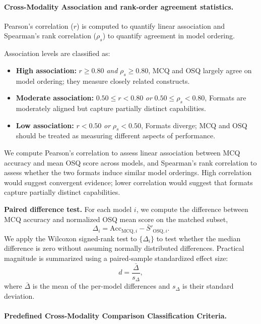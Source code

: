 \paragraph{Cross-Modality Association and rank-order agreement statistics.}
    Pearson's correlation ($r$) is computed to quantify linear association and Spearman's rank correlation ($\rho_s$) to quantify agreement in model ordering.

    Association levels are classified as:
    \begin{itemize}[nosep]
        \item \textbf{High association:} $r \ge 0.80$ \emph{and} $\rho_s \ge 0.80$, MCQ and OSQ largely agree on model ordering; they measure closely related constructs.
        \item \textbf{Moderate association:} $0.50 \le r < 0.80$ \emph{or} $0.50 \le \rho_s < 0.80$, Formats are moderately aligned but capture partially distinct capabilities.
        \item \textbf{Low association:} $r < 0.50$ \emph{or} $\rho_s < 0.50$, Formats diverge; MCQ and OSQ should be treated as measuring different aspects of performance.
    \end{itemize}

    We compute Pearson's correlation to assess linear association between MCQ accuracy and mean OSQ score across models, and Spearman's rank correlation to assess whether the two formats induce similar model orderings. High correlation would suggest convergent evidence; lower correlation would suggest that formats capture partially distinct capabilities.

    \item \textbf{Paired difference test.}
    For each model $i$, we compute the difference between MCQ accuracy and normalized OSQ mean score on the matched subset,
\[
\Delta_i = \text{Acc}_{\text{MCQ},i} - \bar{S}'_{\text{OSQ},i}.
\]
We apply the Wilcoxon signed-rank test to $\{\Delta_i\}$ to test whether the median difference is zero without assuming normally distributed differences. Practical magnitude is summarized using a paired-sample standardized effect size:
\[
d = \frac{\bar{\Delta}}{s_{\Delta}},
\]
where $\bar{\Delta}$ is the mean of the per-model differences and $s_{\Delta}$ is their standard deviation.


\paragraph{Predefined Cross-Modality Comparison Classification Criteria.}

